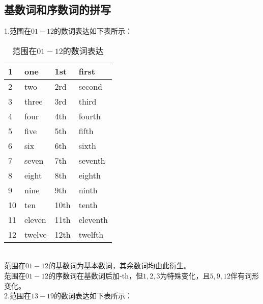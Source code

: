 \documentclass[UTF8]{ctexart}
\newcommand{\littf}[1]{{\hspace{3pt}\ttfamily #1}}
\begin{document}
\subsection{基数词和序数词的拼写}
    1.范围在$01-12$的数词表达如下表所示：\vspace{3pt}
    \begin{table}[h!]
        \begin{center}
            \ttfamily
            \begin{tabular}{p{40pt}|p{100pt}|p{40pt}|p{100pt}}
                \hline
                1&one&1st&first\\ \hline
                2&two&2rd&second\\ \hline
                3&three&3rd&third\\ \hline
                4&four&4th&fourth\\ \hline
                5&five&5th&fifth\\ \hline
                6&six&6th&sixth\\ \hline
                7&seven&7th&seventh\\ \hline
                8&eight&8th&eighth\\ \hline
                9&nine&9th&ninth\\ \hline
                10&ten&10th&tenth\\ \hline
                11&eleven&11th&eleventh\\ \hline
                12&twelve&12th&twelfth\\ \hline
            \end{tabular}
            \rmfamily
            \caption{范围在$01-12$的数词表达}
        \end{center}
    \end{table}\\
    范围在$01-12$的基数词为基本数词，其余数词均由此衍生。\\[3mm]
    范围在$01-12$的序数词在基数词后加\littf{-th}，但$1,2,3$为特殊变化，且$5,9,12$伴有词形变化。\\[8mm]
    2.范围在$13-19$的数词表达如下表所示：\vspace{3pt}
\end{document}
